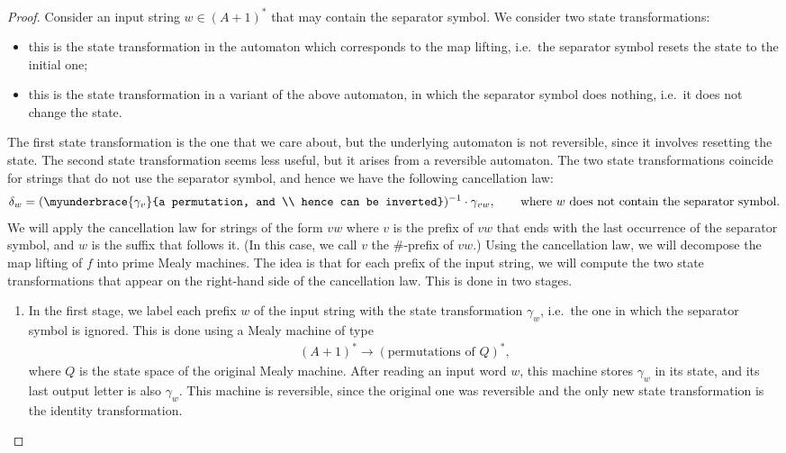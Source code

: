 \begin{proof}
    Consider an input string $w \in (A+1)^*$ that may contain the separator symbol. We consider two state transformations:
    \begin{itemize}
        \item[$\delta_w$] this is the state transformation in the automaton which corresponds to the  map lifting, i.e.~the separator symbol resets the state to the initial one;
        \item[$\gamma_w$] this is the state transformation in a variant of the above automaton, in which the separator symbol does nothing, i.e.~it does not change the state.
    \end{itemize} 
    The first state transformation is the one that we care about, but  the underlying automaton is not reversible, since it involves resetting the state. The second state transformation seems less useful, but it arises from a reversible automaton. The two state transformations coincide for strings that do not use the separator symbol, and hence we have the following cancellation law: 
    \begin{align}\label{eq:cancellation}
    \delta_{w} = (\myunderbrace{\gamma_{v}}{a permutation, and \\ hence can be inverted})^{-1}  \cdot \gamma_{vw}, 
    \qquad \text{where $w$ does not contain the separator symbol.}
    \end{align}
    We will apply the cancellation law for strings of the form $vw$ where $v$ is the prefix of $vw$ that ends with the last occurrence of the separator symbol, and $w$ is the suffix that follows it. (In this case, we call $v$ the $\#$-prefix of $vw$.)
    Using the  cancellation law, we will  decompose the map lifting of $f$ into prime Mealy machines. The idea is that for each prefix of the input string, we  will compute the two state transformations that appear on the right-hand side of the cancellation law.  This is done in two stages.
    \begin{enumerate}
        \item  In the first stage, we label each prefix $w$ of the input string with the state transformation $\gamma_w$, i.e.~the one in which the separator symbol is ignored. This is done using a Mealy machine of type 
        \begin{align*}
        (A+1)^* \to (\text{permutations of $Q$})^*,
        \end{align*}
        where $Q$ is the state space  of the original Mealy machine. After reading an input word $w$, this machine stores $\gamma_w$ in its state, and its last output letter is also $\gamma_w$. This machine is reversible,  since the original one was reversible and the only new state transformation is the identity transformation. 
        

\end{enumerate}
\end{proof}
